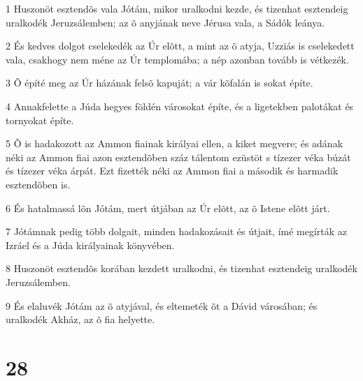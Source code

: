 \par 1 Huszonöt esztendõs vala Jótám, mikor uralkodni kezde, és tizenhat esztendeig uralkodék Jeruzsálemben; az õ anyjának neve Jérusa vala, a Sádók leánya.
\par 2 És kedves dolgot cselekedék az Úr elõtt, a mint az õ atyja, Uzziás is cselekedett vala, csakhogy nem méne az Úr templomába; a nép azonban tovább is vétkezék.
\par 3 Õ építé meg az Úr házának felsõ kapuját; a vár kõfalán is sokat építe.
\par 4 Annakfelette a Júda hegyes földén városokat építe, és a ligetekben palotákat és tornyokat építe.
\par 5 Õ is hadakozott az Ammon fiainak királyai ellen, a kiket megvere; és adának néki az Ammon fiai azon esztendõben száz tálentom ezüstöt s tízezer véka búzát és tízezer véka árpát. Ezt fizették néki az Ammon fiai a második és harmadik esztendõben is.
\par 6 És hatalmassá lõn Jótám, mert útjában az Úr elõtt, az õ Istene elõtt járt.
\par 7 Jótámnak pedig több dolgait, minden hadakozásait és útjait, ímé megírták az Izráel és a Júda királyainak könyvében.
\par 8 Huszonöt esztendõs korában kezdett uralkodni, és tizenhat esztendeig uralkodék Jeruzsálemben.
\par 9 És elaluvék Jótám az õ atyjával, és eltemeték õt a Dávid városában; és uralkodék Akház, az õ fia helyette.

\chapter{28}

